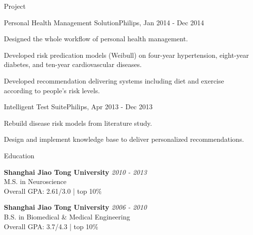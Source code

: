 \documentclass{resume} %
\begin{document}
\begin{rSection}{Project}

\begin{rSubsection}{Personal Health Management Solution}{}{Philips, Jan 2014 - Dec 2014}{}
\item Designed the whole workflow of personal health management.
\item Developed risk predication models (Weibull) on four-year hypertension, eight-year diabetes, and ten-year cardiovascular diseases.
\item Developed recommendation delivering systems including diet and exercise according to people's risk levels.
\end{rSubsection}


\begin{rSubsection}{Intelligent Test Suite}{}{Philips, Apr 2013 - Dec 2013}{}
\item Rebuild disease risk models from literature study.
\item Design and implement knowledge base to deliver personalized recommendations.
\end{rSubsection}

\end{rSection}


\begin{rSection}{Education}

{\bf Shanghai Jiao Tong University} \hfill {\em 2010 - 2013} \\ 
M.S. in Neuroscience \\
Overall GPA: 2.61/3.0 | top 10\%

{\bf Shanghai Jiao Tong University} \hfill {\em 2006 - 2010} \\ 
B.S. in Biomedical \& Medical Engineering \\
Overall GPA: 3.7/4.3 | top 10\%

\end{rSection}

\end{document}
